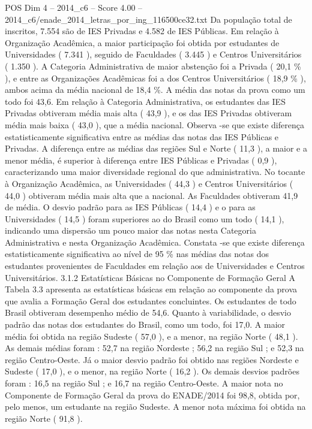\begin{textsample}{POS Dim 4 – 2014\_c6 – Score 4.00 – 2014\_c6/enade\_2014\_letras\_por\_ing\_116500ce32.txt}
Da população total de inscritos, 7.554 são de IES Privadas e 4.582 de IES Públicas.
Em relação à Organização Acadêmica, a maior participação foi obtida por estudantes de Universidades ( 7.341 ), seguido de Faculdades ( 3.445 ) e Centros Universitários ( 1.350 ).
A Categoria Administrativa de maior abstenção foi a Privada ( 20,1 \% ), e entre as Organizações Acadêmicas foi a dos Centros Universitários ( 18,9 \% ), ambos acima da média nacional de 18,4 \%.
A média das notas da prova como um todo foi 43,6.
Em relação à Categoria Administrativa, os estudantes das IES Privadas obtiveram média mais alta ( 43,9 ), e os das IES Privadas obtiveram média mais baixa ( 43,0 ), que a média nacional.
Observa -se que existe diferença estatisticamente significativa entre as médias das notas das IES Públicas e Privadas.
A diferença entre as médias das regiões Sul e Norte ( 11,3 ), a maior e a menor média, é superior à diferença entre IES Públicas e Privadas ( 0,9 ), caracterizando uma maior diversidade regional do que administrativa.
No tocante à Organização Acadêmica, as Universidades ( 44,3 ) e Centros Universitários ( 44,0 ) obtiveram média mais alta que a nacional.
As Faculdades obtiveram 41,9 de média.
O desvio padrão para as IES Públicas ( 14,4 ) e o para as Universidades ( 14,5 ) foram superiores ao do Brasil como um todo ( 14,1 ), indicando uma dispersão um pouco maior das notas nesta Categoria Administrativa e nesta Organização Acadêmica.
Constata -se que existe diferença estatisticamente significativa ao nível de 95 \% nas médias das notas dos estudantes provenientes de Faculdades em relação aos de Universidades e Centros Universitários. 3.1.2 Estatísticas Básicas no Componente de Formação Geral A Tabela 3.3 apresenta as estatísticas básicas em relação ao componente da prova que avalia a Formação Geral dos estudantes concluintes.
Os estudantes de todo Brasil obtiveram desempenho médio de 54,6.
Quanto à variabilidade, o desvio padrão das notas dos estudantes do Brasil, como um todo, foi 17,0.
A maior média foi obtida na região Sudeste ( 57,0 ), e a menor, na região Norte ( 48,1 ).
As demais médias foram : 52,7 na região Nordeste ; 56,2 na região Sul ; e 52,3 na região Centro-Oeste.
Já o maior desvio padrão foi obtido nas regiões Nordeste e Sudeste ( 17,0 ), e o menor, na região Norte ( 16,2 ).
Os demais desvios padrões foram : 16,5 na região Sul ; e 16,7 na região Centro-Oeste.
A maior nota no Componente de Formação Geral da prova do ENADE/2014 foi 98,8, obtida por, pelo menos, um estudante na região Sudeste.
A menor nota máxima foi obtida na região Norte ( 91,8 ).

\end{textsample}
